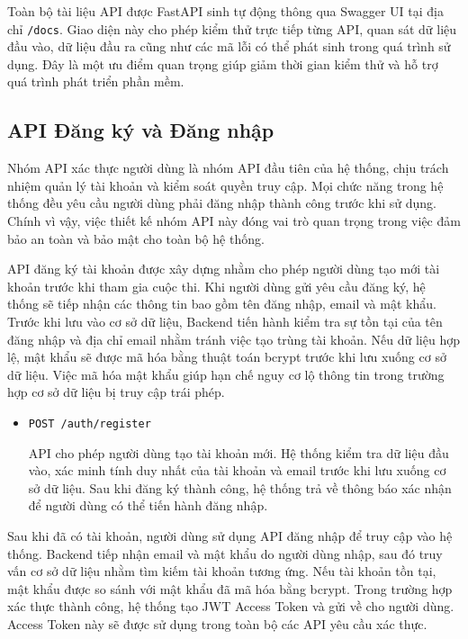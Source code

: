 Toàn bộ tài liệu API được FastAPI sinh tự động thông qua Swagger UI tại địa chỉ \texttt{/docs}. Giao diện này cho phép kiểm thử trực tiếp từng API, quan sát dữ liệu đầu vào, dữ liệu đầu ra cũng như các mã lỗi có thể phát sinh trong quá trình sử dụng. Đây là một ưu điểm quan trọng giúp giảm thời gian kiểm thử và hỗ trợ quá trình phát triển phần mềm.

\subsection{API Đăng ký và Đăng nhập}

Nhóm API xác thực người dùng là nhóm API đầu tiên của hệ thống, chịu trách nhiệm quản lý tài khoản và kiểm soát quyền truy cập. Mọi chức năng trong hệ thống đều yêu cầu người dùng phải đăng nhập thành công trước khi sử dụng. Chính vì vậy, việc thiết kế nhóm API này đóng vai trò quan trọng trong việc đảm bảo an toàn và bảo mật cho toàn bộ hệ thống.

API đăng ký tài khoản được xây dựng nhằm cho phép người dùng tạo mới tài khoản trước khi tham gia cuộc thi. Khi người dùng gửi yêu cầu đăng ký, hệ thống sẽ tiếp nhận các thông tin bao gồm tên đăng nhập, email và mật khẩu. Trước khi lưu vào cơ sở dữ liệu, Backend tiến hành kiểm tra sự tồn tại của tên đăng nhập và địa chỉ email nhằm tránh việc tạo trùng tài khoản. Nếu dữ liệu hợp lệ, mật khẩu sẽ được mã hóa bằng thuật toán bcrypt trước khi lưu xuống cơ sở dữ liệu. Việc mã hóa mật khẩu giúp hạn chế nguy cơ lộ thông tin trong trường hợp cơ sở dữ liệu bị truy cập trái phép.

\begin{itemize}
	\item \texttt{POST /auth/register}
	
	API cho phép người dùng tạo tài khoản mới. Hệ thống kiểm tra dữ liệu đầu vào, xác minh tính duy nhất của tài khoản và email trước khi lưu xuống cơ sở dữ liệu. Sau khi đăng ký thành công, hệ thống trả về thông báo xác nhận để người dùng có thể tiến hành đăng nhập.
\end{itemize}

Sau khi đã có tài khoản, người dùng sử dụng API đăng nhập để truy cập vào hệ thống. Backend tiếp nhận email và mật khẩu do người dùng nhập, sau đó truy vấn cơ sở dữ liệu nhằm tìm kiếm tài khoản tương ứng. Nếu tài khoản tồn tại, mật khẩu được so sánh với mật khẩu đã mã hóa bằng bcrypt. Trong trường hợp xác thực thành công, hệ thống tạo JWT Access Token và gửi về cho người dùng. Access Token này sẽ được sử dụng trong toàn bộ các API yêu cầu xác thực.

